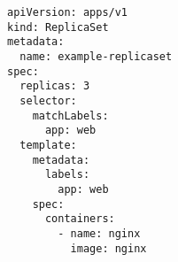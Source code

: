 \begin{verbatim}
apiVersion: apps/v1
kind: ReplicaSet
metadata:
  name: example-replicaset
spec:
  replicas: 3
  selector:
    matchLabels:
      app: web
  template:
    metadata:
      labels:
        app: web
    spec:
      containers:
        - name: nginx
          image: nginx
\end{verbatim}
